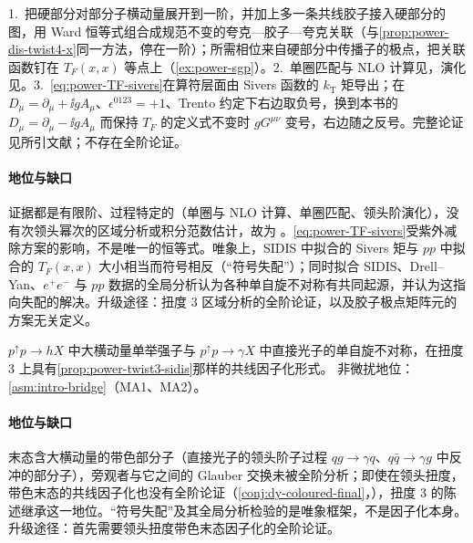 \begin{proofsketch}
1.~把硬部分对部分子横动量展开到一阶，并加上多一条共线胶子接入硬部分的图，用 Ward 恒等式组合成规范不变的夸克—胶子—夸克关联（与\cref{prop:power-dis-twist4-x}同一方法，停在一阶）；所需相位来自硬部分中传播子的极点，把关联函数钉在 $T_F(x,x)$ 等点上（\cref{ex:power-sgp}）。2.~单圈匹配与 NLO 计算见\cite{Ji:2006ub,Vogelsang:2009pj}，演化见\cite{Braun:2009mi,Kang:2008ey,Kang:2012em,Schafer:2012ra}。3.~\eqref{eq:power-TF-sivers}在算符层面由 Sivers 函数的 $k_{\mathrm T}$ 矩导出\cite{Boer:2003cm}；在 $D_\mu=\partial_\mu+\ii gA_\mu$、$\epsilon^{0123}=+1$、Trento 约定下右边取负号\cite[式~(10)]{Kang:2011hk}，换到本书的 $D_\mu=\partial_\mu-\ii gA_\mu$ 而保持 $T_F$ 的定义式不变时 $gG^{\mu\nu}$ 变号，右边随之反号。完整论证见所引文献；不存在全阶论证。
\end{proofsketch}

\paragraph{地位与缺口}
证据都是有限阶、过程特定的（单圈与 NLO 计算、单圈匹配、领头阶演化），没有次领头幂次的区域分析或积分范数估计，故为 \tagP。\eqref{eq:power-TF-sivers}受紫外减除方案的影响，不是唯一的恒等式\cite[第~II~节]{Kang:2011hk}。唯象上，SIDIS 中拟合的 Sivers 矩与 $pp$ 中拟合的 $T_F(x,x)$ 大小相当而符号相反（“符号失配”）\cite{Kang:2011hk}；同时拟合 SIDIS、Drell--Yan、$e^+e^-$ 与 $pp$ 数据的全局分析认为各种单自旋不对称有共同起源，并认为这指向失配的解决\cite{Cammarota:2020qcw}。升级途径：扭度 3 区域分析的全阶论证，以及胶子极点矩阵元的方案无关定义。

\begin{conjecture}\label{conj:power-twist3-pp}
$p^\uparrow p\to hX$ 中大横动量单举强子\cite{QiuSterman1991c,Qiu:1998ia}与 $p^\uparrow p\to\gamma X$ 中直接光子\cite{QiuSterman1992}的单自旋不对称，在扭度 3 上具有\cref{prop:power-twist3-sidis}那样的共线因子化形式。
非微扰地位：\cref{asm:intro-bridge}（MA1、MA2）。
\end{conjecture}

\paragraph{地位与缺口}
末态含大横动量的带色部分子（直接光子的领头阶子过程 $qg\to\gamma q$、$q\bar q\to\gamma g$ 中反冲的部分子），旁观者与它之间的 Glauber 交换未被全阶分析；即使在领头扭度，带色末态的共线因子化也没有全阶论证（\cref{conj:dy-coloured-final}，\tagC），扭度 3 的陈述继承这一地位。“符号失配”\cite{Kang:2011hk}及其全局分析\cite{Cammarota:2020qcw}检验的是唯象框架，不是因子化本身。升级途径：首先需要领头扭度带色末态因子化的全阶论证。

